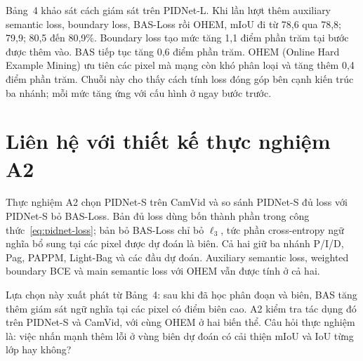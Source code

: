 Bảng~4 khảo sát cách giám sát trên PIDNet-L. Khi lần lượt thêm auxiliary semantic loss, boundary loss, BAS-Loss rồi OHEM, mIoU đi từ 78,6 qua 78,8; 79,9; 80,5 đến 80,9\%. Boundary loss tạo mức tăng 1,1 điểm phần trăm tại bước được thêm vào. BAS tiếp tục tăng 0,6 điểm phần trăm. OHEM (Online Hard Example Mining) ưu tiên các pixel mà mạng còn khó phân loại và tăng thêm 0,4 điểm phần trăm. Chuỗi này cho thấy cách tính loss đóng góp bên cạnh kiến trúc ba nhánh; mỗi mức tăng ứng với cấu hình ở ngay bước trước.

\section{Liên hệ với thiết kế thực nghiệm A2}
Thực nghiệm A2 chọn PIDNet-S trên CamVid và so sánh PIDNet-S đủ loss với PIDNet-S bỏ BAS-Loss. Bản đủ loss dùng bốn thành phần trong công thức~\eqref{eq:pidnet-loss}; bản bỏ BAS-Loss chỉ bỏ $\ell_3$, tức phần cross-entropy ngữ nghĩa bổ sung tại các pixel được dự đoán là biên. Cả hai giữ ba nhánh P/I/D, Pag, PAPPM, Light-Bag và các đầu dự đoán. Auxiliary semantic loss, weighted boundary BCE và main semantic loss với OHEM vẫn được tính ở cả hai.

Lựa chọn này xuất phát từ Bảng~4: sau khi đã học phân đoạn và biên, BAS tăng thêm giám sát ngữ nghĩa tại các pixel có điểm biên cao. A2 kiểm tra tác dụng đó trên PIDNet-S và CamVid, với cùng OHEM ở hai biến thể. Câu hỏi thực nghiệm là: việc nhấn mạnh thêm lỗi ở vùng biên dự đoán có cải thiện mIoU và IoU từng lớp hay không?
